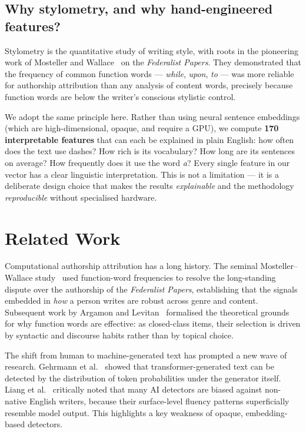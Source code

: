 \documentclass[11pt,a4paper]{article}
\begin{document}
\subsection*{Why stylometry, and why hand-engineered features?}

Stylometry is the quantitative study of writing style, with roots in
the pioneering work of Mosteller and Wallace~\cite{mosteller} on the
\textit{Federalist Papers}. They demonstrated that the frequency of
common function words --- \textit{while}, \textit{upon}, \textit{to}
--- was more reliable for authorship attribution than any analysis of
content words, precisely because function words are below the writer's
conscious stylistic control.

We adopt the same principle here. Rather than using neural sentence
embeddings (which are high-dimensional, opaque, and require a
GPU), we compute \textbf{170 interpretable features} that can each
be explained in plain English: how often does the text use dashes?
How rich is its vocabulary? How long are its sentences on average?
How frequently does it use the word \textit{a}? Every single feature
in our vector has a clear linguistic interpretation. This is not a
limitation --- it is a deliberate design choice that makes the
results \emph{explainable} and the methodology \emph{reproducible}
without specialised hardware.

\section{Related Work}
\label{sec:related}

Computational authorship attribution has a long history. The seminal
Mosteller--Wallace study~\cite{mosteller} used function-word
frequencies to resolve the long-standing dispute over the authorship
of the \textit{Federalist Papers}, establishing that the signals
embedded in \textit{how} a person writes are robust across genre
and content. Subsequent work by Argamon and
Levitan~\cite{argamon} formalised the theoretical grounds for why
function words are effective: as closed-class items, their selection
is driven by syntactic and discourse habits rather than by topical
choice.

The shift from human to machine-generated text has prompted a new
wave of research. Gehrmann et al.~\cite{gehrmann} showed that
transformer-generated text can be detected by the distribution of
token probabilities under the generator itself. Liang et
al.~\cite{liang2023} critically noted that many AI detectors are
biased against non-native English writers, because their surface-level
fluency patterns superficially resemble model output. This highlights
a key weakness of opaque, embedding-based detectors.
\end{document}
